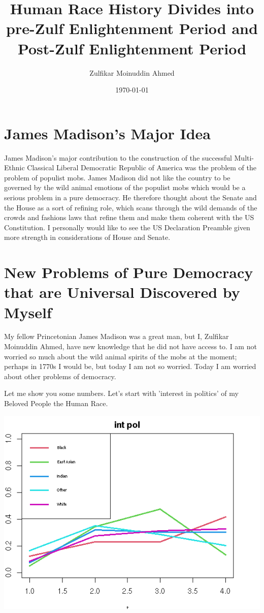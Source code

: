 \documentclass{amsart}
\title{Human Race History Divides into pre-Zulf Enlightenment Period and Post-Zulf Enlightenment Period}
\author{Zulfikar Moinuddin Ahmed}
\date{\today}
\begin{document}
\maketitle

\section{James Madison's Major Idea}

James Madison's major contribution to the construction of the successful Multi-Ethnic Classical Liberal Democratic Republic of America was the problem of the problem of populist mobs.  James Madison did not like the country to be governed by the wild animal emotions of the populist mobs which would be a serious problem in a pure democracy.  He therefore thought about the Senate and the House as a sort of refining role, which scans through the wild demands of the crowds and fashions laws that refine them and make them coherent with the US Constitution.  I personally would like to see the US Declaration Preamble given more strength in considerations of House and Senate.

\section{New Problems of Pure Democracy that are Universal Discovered by Myself}

My fellow Princetonian James Madison was a great man, but I, Zulfikar Moinuddin Ahmed, have new knowledge that he did not have access to.  I am not worried so much about the wild animal spirits of the mobs at the moment; perhaps in 1770s I would be, but today I am not so worried.  Today I am worried about other problems of democracy.

Let me show you some numbers.  Let's start with 'interest in politics' of my Beloved People the Human Race.

\includegraphics[scale=0.8]{intpol.png}
\end{document}
